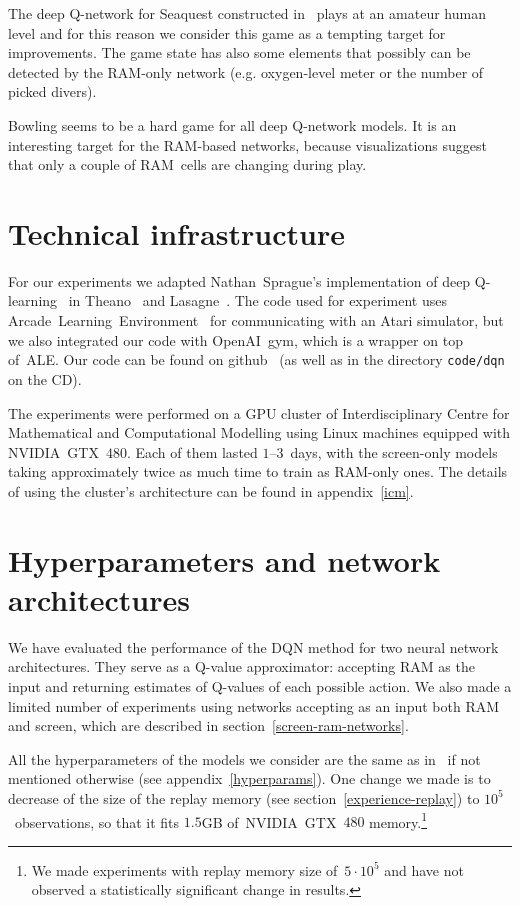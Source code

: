 The deep Q-network for Seaquest constructed in~\cite{nips-dqn} plays at an amateur human level and for this reason we consider this game as a tempting target for improvements. The game state has also some elements that possibly can be detected by the RAM-only network (e.g. oxygen-level meter or the number of picked divers).

Bowling seems to be a hard game for all deep Q-network models. It is an interesting target for the RAM-based networks, because visualizations suggest that only a couple of RAM~cells are changing during play.

\section{Technical infrastructure}\label{technical}
For our experiments we adapted Nathan~Sprague's implementation of deep Q-learning~\cite{sprague} in Theano~\cite{theano} and Lasagne~\cite{lasagne}. The code used for experiment uses Arcade~Learning~Environment~\cite{ale} for communicating with an Atari simulator, but we also integrated our code with OpenAI~gym, which is a wrapper on top of~ALE. Our code can be found on github~\cite{our-dqn} (as well as in the directory \texttt{code/dqn} on the CD).

The experiments were performed on a GPU cluster of Interdisciplinary Centre for Mathematical and Computational Modelling using Linux machines equipped with NVIDIA~GTX~$480$. Each of them lasted $1$--$3$~days, with the screen-only models taking approximately twice as much time to train as RAM-only ones. The details of using the cluster's architecture can be found in appendix~\ref{icm}.

\section{Hyperparameters and network architectures}

We have evaluated the performance of the DQN method for two neural network architectures. They serve as a Q-value approximator: accepting RAM as the input and returning estimates of Q-values of each possible action. We also made a limited number of experiments using networks accepting as an input both RAM and screen, which are described in section~\ref{screen-ram-networks}.

All the hyperparameters of the models we consider are the same as in~\cite{nips-dqn} if not mentioned otherwise (see appendix~\ref{hyperparams}). One change we made is to decrease of the size of the replay memory (see section~\ref{experience-replay}) to $10^5$~observations, so that it fits $1.5$GB of~NVIDIA~GTX~$480$ memory.\footnote{We made experiments with replay memory size of~$5\cdot 10^5$ and have not observed a statistically significant change in results.}

